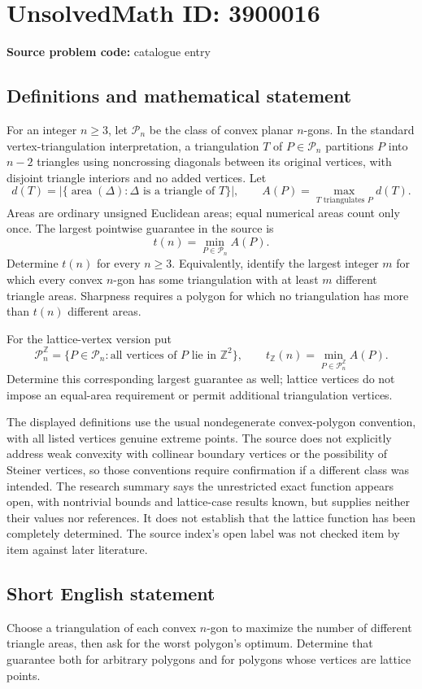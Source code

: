 \documentclass[11pt]{article}
\begin{document}
\section*{UnsolvedMath ID: 3900016}
\textbf{Source problem code:} catalogue entry
\subsection{Definitions and mathematical statement}
For an integer \(n\ge3\), let \(\mathcal P_n\) be the class of convex planar \(n\)-gons. In the standard vertex-triangulation interpretation, a triangulation \(T\) of \(P\in\mathcal P_n\) partitions \(P\) into \(n-2\) triangles using noncrossing diagonals between its original vertices, with disjoint triangle interiors and no added vertices. Let
\[
 d(T)=\left|\{\operatorname{area}(\Delta):\Delta\text{ is a triangle of }T\}\right|,
 \qquad
 A(P)=\max_{T\text{ triangulates }P}d(T).
\]
Areas are ordinary unsigned Euclidean areas; equal numerical areas count only once. The largest pointwise guarantee in the source is
\[
 t(n)=\min_{P\in\mathcal P_n} A(P).
\]
Determine \(t(n)\) for every \(n\ge3\). Equivalently, identify the largest integer \(m\) for which every convex \(n\)-gon has some triangulation with at least \(m\) different triangle areas. Sharpness requires a polygon for which no triangulation has more than \(t(n)\) different areas.

For the lattice-vertex version put
\[
 \mathcal P_n^{\mathbb Z}=\{P\in\mathcal P_n:\text{all vertices of }P\text{ lie in }\mathbb Z^2\},
 \qquad
 t_{\mathbb Z}(n)=\min_{P\in\mathcal P_n^{\mathbb Z}} A(P).
\]
Determine this corresponding largest guarantee as well; lattice vertices do not impose an equal-area requirement or permit additional triangulation vertices.

The displayed definitions use the usual nondegenerate convex-polygon convention, with all listed vertices genuine extreme points. The source does not explicitly address weak convexity with collinear boundary vertices or the possibility of Steiner vertices, so those conventions require confirmation if a different class was intended. The research summary says the unrestricted exact function appears open, with nontrivial bounds and lattice-case results known, but supplies neither their values nor references. It does not establish that the lattice function has been completely determined. The source index's open label was not checked item by item against later literature.
\subsection{Short English statement}
Choose a triangulation of each convex \(n\)-gon to maximize the number of different triangle areas, then ask for the worst polygon's optimum. Determine that guarantee both for arbitrary polygons and for polygons whose vertices are lattice points.
\end{document}

